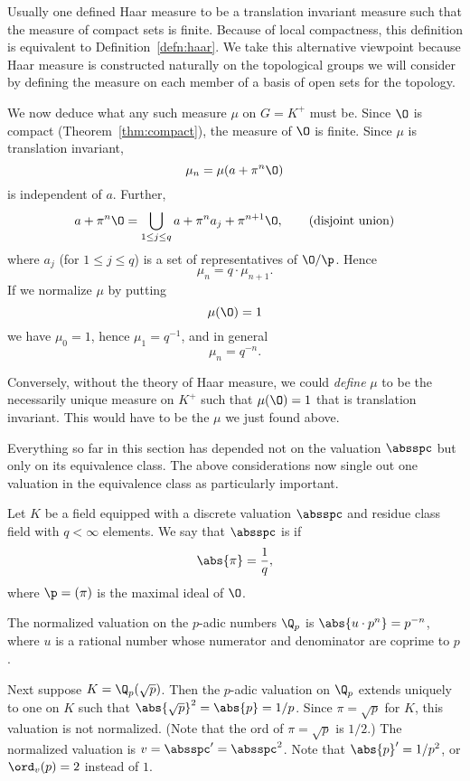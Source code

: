 \documentclass[11pt]{book}
\begin{document}
\begin{ch}
\begin{remark}
  Usually one defined Haar measure to be a translation invariant
  measure such that the measure of compact sets is finite.  Because of
  local compactness, this definition is equivalent to
  Definition~\ref{defn:haar}.  We take this alternative viewpoint
  because Haar measure is constructed naturally on the topological
  groups we will consider by defining the measure on each member of a
  basis of open sets for the topology.
\end{remark}

We now deduce what any such measure $\mu$ on $G=K^+$ must be.  Since
$\O$ is compact (Theorem~\ref{thm:compact}), the measure of $\O$ is
finite.  Since $\mu$ is translation invariant,
$$
  \mu_n = \mu(a + \pi^n \O)
$$
is independent of $a$.  Further,
$$
a + \pi^n\O = \bigcup_{1\leq j\leq q} a + \pi^n a_j + \pi^{n+1}\O,
\qquad\text{(disjoint union)}
$$
where $a_j$ (for $1\leq j \leq q$) is a set of representatives of
$\O/\p$. Hence
$$
 \mu_n = q\cdot \mu_{n+1}.
$$
If we normalize $\mu$ by putting
$$
 \mu(\O) = 1
 $$
 we have $\mu_0 = 1$, hence $\mu_1 = q^{-1}$, and in general $$\mu_n =
 q^{-n}.$$

 Conversely, without the theory of Haar measure, we could {\em define}
 $\mu$ to be the necessarily unique measure on $K^+$ such that
 $\mu(\O)=1$ that is translation invariant.  This would have to be the
 $\mu$ we just found above.

 Everything so far in this section has depended not on the valuation
 $\absspc$ but only on its equivalence class.  The above
 considerations now single out one valuation in the equivalence class
 as particularly important.
\begin{definition}\label{defn:normalized}
Let $K$ be a field equipped with a discrete valuation $\absspc$
and residue class field with $q<\infty$ elements.  We say that
$\absspc$ is  if
$$
\abs{\pi} = \frac{1}{q},
$$
where $\p=(\pi)$ is the maximal ideal of $\O$.
\end{definition}
\begin{example}
The normalized valuation on the $p$-adic numbers $\Q_p$ is
$\abs{u\cdot p^n} = p^{-n}$, where $u$ is a rational number
whose numerator and denominator are coprime to $p$.

Next suppose $K=\Q_p(\sqrt{p})$.  Then the $p$-adic valuation on
$\Q_p$ extends uniquely to one on $K$ such that
$\abs{\sqrt{p}}^2 = \abs{p} = 1/p$.  Since $\pi=\sqrt{p}$
for $K$, this valuation is not normalized.  (Note that
the ord of $\pi=\sqrt{p}$ is $1/2$.)
The normalized valuation is $v=\absspc' = \absspc^2$.  Note that
$\abs{p}' = 1/p^2$, or $\ord_v(p)=2$ instead of $1$.


\end{example}
\end{ch}
\end{document}
